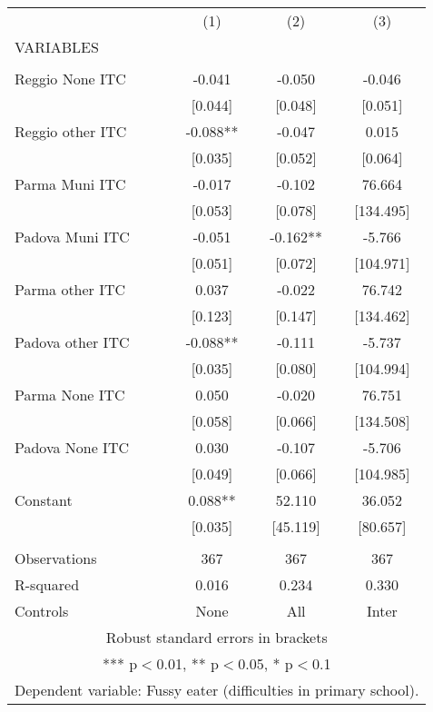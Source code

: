 \begin{tabular}{lccc} \hline
 & (1) & (2) & (3) \\
VARIABLES &  &  &  \\ \hline
 &  &  &  \\
Reggio None ITC & -0.041 & -0.050 & -0.046 \\
 & [0.044] & [0.048] & [0.051] \\
Reggio other ITC & -0.088** & -0.047 & 0.015 \\
 & [0.035] & [0.052] & [0.064] \\
Parma Muni ITC & -0.017 & -0.102 & 76.664 \\
 & [0.053] & [0.078] & [134.495] \\
Padova Muni ITC & -0.051 & -0.162** & -5.766 \\
 & [0.051] & [0.072] & [104.971] \\
Parma other ITC & 0.037 & -0.022 & 76.742 \\
 & [0.123] & [0.147] & [134.462] \\
Padova other ITC & -0.088** & -0.111 & -5.737 \\
 & [0.035] & [0.080] & [104.994] \\
Parma None ITC & 0.050 & -0.020 & 76.751 \\
 & [0.058] & [0.066] & [134.508] \\
Padova None ITC & 0.030 & -0.107 & -5.706 \\
 & [0.049] & [0.066] & [104.985] \\
Constant & 0.088** & 52.110 & 36.052 \\
 & [0.035] & [45.119] & [80.657] \\
 &  &  &  \\
Observations & 367 & 367 & 367 \\
R-squared & 0.016 & 0.234 & 0.330 \\
 Controls & None & All & Inter \\ \hline
\multicolumn{4}{c}{ Robust standard errors in brackets} \\
\multicolumn{4}{c}{ *** p$<$0.01, ** p$<$0.05, * p$<$0.1} \\
\multicolumn{4}{c}{ Dependent variable: Fussy eater (difficulties in primary school).} \\
\end{tabular}
